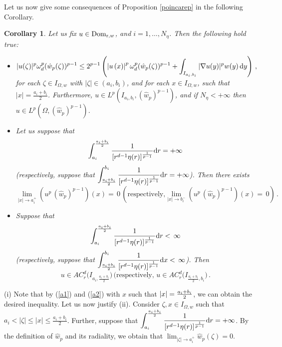 \documentclass[11pt,leqno]{amsart}
\newtheorem{cor}[teo]{Corollary}
\theoremstyle{remark}
\theoremstyle{definition}
\theoremstyle{definition}
\newcommand{\wstar}{{\hat w}}
\def\de{{\rm d}}
\begin{document}
Let us now give some consequences of Proposition \ref{poincarep} in the following Corollary.
\begin{cor}\label{proppp1}
Let us fix $u\in {\rm{Dom}}_{{\mathrm r},w}$, and $i=1,\dots,N_\eta$. Then the following hold true:
\begin{itemize}
\item[(i)]
$\displaystyle
|u(\zeta)|^{p}\omega_{d}^{p}(\wstar_{p}(\zeta))^{p-1}
\leq 2^{p-1}\left(\left|u\left(x\right)\right|^{p}\omega_{d}^{p}(\wstar_{p}(\zeta))^{p-1}
+\int_{I_{a_{i},b_{i}}}|\nabla u(y)|^{p}w(y)\,\de y\right)\,,
$
for each $\zeta\in I_{\Omega,w}$ with $\vert\zeta\vert\in (a_i,b_i)$, and for each $x\in I_{\Omega,w}$, such that $\vert x \vert=\frac{a_i+b_i}{2}$. Furthermore, $u\in L^{p}(I_{a_{i},b_{i}},(\wstar_{p})^{p-1})$, and if $N_{\eta}<+\infty$  then $u\in L^{p}(\Omega,(\wstar_{p})^{p-1})$.
\item[(ii)] Let us suppose that
\begin{align*}
\displaystyle{\int_{a_i}^{\frac{a_i+b_i}{2}}\frac{1}{[r^{d-1}\eta(r)]^{\frac{1}{p-1}}}\de r=+\infty}
\end{align*}
(respectively, suppose that $\displaystyle{\int_{\frac{a_i+b_i}{2}}^{b_i}\frac{1}{[r^{d-1}\eta(r)]^{\frac{1}{p-1}}}\de r=+\infty}$). Then there exists 
$$\displaystyle\lim_{\vert x\vert\to a_i^+} (u^{p} \,(\wstar_{p})^{p-1})(x)=\,0 \,(\text{respectively,}\lim_{\vert x\vert\to b_i^-} (u^{p} \,(\wstar_{p})^{p-1})(x)=\,0)\,.
$$
\item[(iii)] Suppose that 
\begin{align*}
\displaystyle{\int_{a_i}^{\frac{a_i+b_i}{2}}\frac{1}{[r^{d-1}\eta(r)]^{\frac{1}{p-1}}}\de r<\,\infty}
\end{align*}
(respectively, suppose that $\displaystyle{\int_{\frac{a_i+b_i}{2}}^{b_i}\frac{1}{[r^{d-1}\eta(r)]^{\frac{1}{p-1}}}\de x<\,\infty}$). Then 
\[u\in AC_{r}^{d}\Big(I_{a_i,\frac{a_i+b_i}{2}}\Big) \,(\text{respectively, }u\in AC_{r}^{d}\Big(I_{\frac{a_i+b_i}{2},b_i}\Big)\,.
\]
\end{itemize}
\end{cor}
\proof
(i) Note that by (\ref{a1}) and  (\ref{a2}) with $x$ such that $\vert x\vert={{a_i+b_i}\over{2}}$, we can obtain the desired inequality. Let us now justify (ii).  Consider $\zeta,x\in I_{\Omega,w}$ such that $ a_i<\vert\zeta\vert\leq \vert x\vert\leq \frac{a_i+b_i}{2}$. Further, suppose that $\displaystyle{\int_{a_i}^{\frac{a_i+b_i}{2}}\frac{1}{[r^{d-1}\eta(r)]^{\frac{1}{p-1}}}\de r=+\infty}$. By the definition of $\wstar_{p}$ and its radiality, we obtain that $\lim_{\vert\zeta\vert\to a_i^+}\wstar_{p}(\zeta)=0$.
\end{document}
